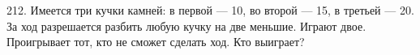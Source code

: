 212. Имеется три кучки камней: в первой --- 10, во второй --- 15, в третьей --- 20. За ход разрешается разбить любую кучку на две меньшие. Играют двое. Проигрывает тот, кто не сможет сделать ход. Кто выиграет?\\
